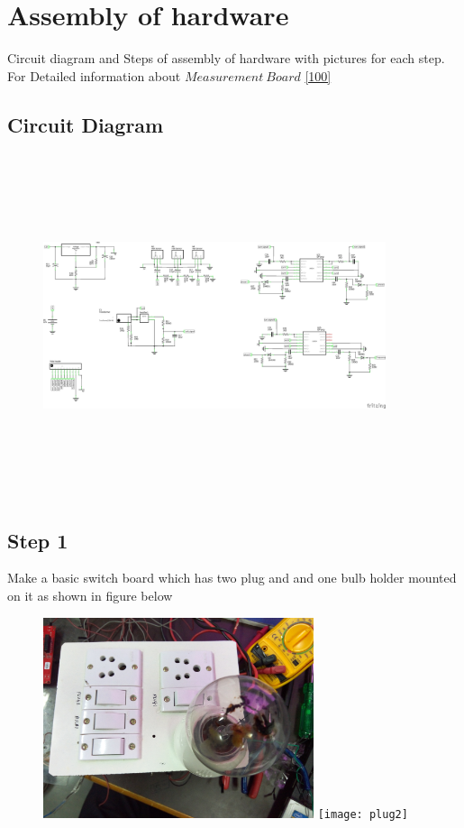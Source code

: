 \documentclass[a4paper,12pt,oneside]{book}
\begin{document}
\newpage
\section{Assembly of hardware}
Circuit diagram and Steps of assembly of hardware with pictures for each step. For Detailed information about $Measurement\ Board$ \autoref{100}
\subsection*{Circuit Diagram}
\begin{figure}[h]
	\includegraphics[width=380px,height=380px]{schematic}
\end{figure}
\newpage
\subsection*{Step 1}
Make a basic switch board which has two plug and and one bulb holder mounted on it as 
shown in figure below
\begin{figure}[h]
	\includegraphics[width=300px]{plug1}
	\texttt{[image: plug2]}
\end{figure}
\newpage
\end{document}

